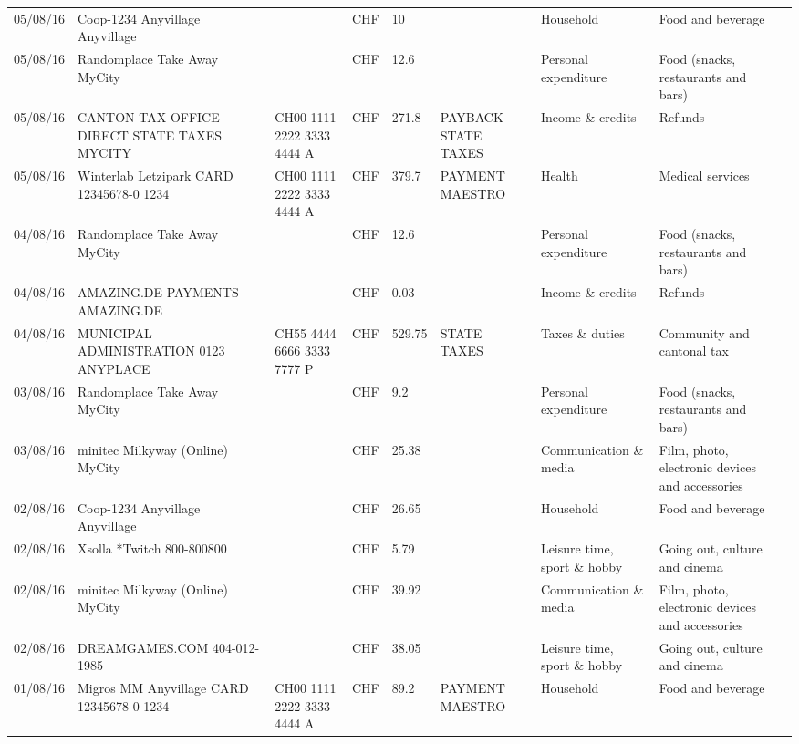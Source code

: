 \begin{landscape}
\begin{tiny}
\begin{longtable}{lp{4cm}llllp{3cm}ll}
		    05/08/16 & Coop-1234 Anyvillage    Anyvillage &       & CHF   & 10    &       & Household & Food and beverage \\
		    05/08/16 & Randomplace Take Away     MyCity &       & CHF   & 12.6  &       & Personal expenditure & Food (snacks, restaurants and bars) \\
		    05/08/16 & CANTON TAX OFFICE DIRECT STATE TAXES MYCITY & CH00 1111 2222 3333 4444 A & CHF   & 271.8 & PAYBACK STATE TAXES & Income \& credits & Refunds \\
		    05/08/16 & Winterlab Letzipark CARD 12345678-0 1234 & CH00 1111 2222 3333 4444 A & CHF   & 379.7 & PAYMENT MAESTRO & Health & Medical services  \\
		    04/08/16 & Randomplace Take Away     MyCity &       & CHF   & 12.6  &       & Personal expenditure & Food (snacks, restaurants and bars) \\
		    04/08/16 & AMAZING.DE PAYMENTS       AMAZING.DE &       & CHF   & 0.03  &       & Income \& credits & Refunds \\
		    04/08/16 & MUNICIPAL ADMINISTRATION 0123 ANYPLACE & CH55 4444 6666 3333 7777 P & CHF   & 529.75 & STATE TAXES & Taxes \& duties & Community and cantonal tax \\
		    03/08/16 & Randomplace Take Away     MyCity &       & CHF   & 9.2   &       & Personal expenditure & Food (snacks, restaurants and bars) \\
		    03/08/16 & minitec Milkyway (Online) MyCity &       & CHF   & 25.38 &       & Communication \& media & Film, photo, electronic devices and accessories \\
		    02/08/16 & Coop-1234 Anyvillage    Anyvillage &       & CHF   & 26.65 &       & Household & Food and beverage \\
		    02/08/16 & Xsolla *Twitch           800-800800 &       & CHF   & 5.79  &       & Leisure time, sport \& hobby & Going out, culture and cinema \\
		    02/08/16 & minitec Milkyway (Online) MyCity &       & CHF   & 39.92 &       & Communication \& media & Film, photo, electronic devices and accessories \\
		    02/08/16 & DREAMGAMES.COM           404-012-1985 &       & CHF   & 38.05 &       & Leisure time, sport \& hobby & Going out, culture and cinema \\
		    01/08/16 & Migros MM Anyvillage CARD 12345678-0 1234 & CH00 1111 2222 3333 4444 A & CHF   & 89.2  & PAYMENT MAESTRO & Household & Food and beverage \\

\end{longtable}
\end{tiny}
\end{landscape}
